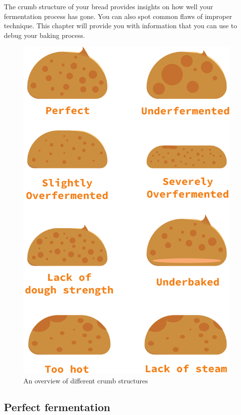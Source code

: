 The crumb structure of your bread provides insights on how well
your fermentation process has gone. You can also spot common flaws
of improper technique. This chapter will provide you with information
that you can use to debug your baking process.

\begin{figure}
  \includegraphics[width=\textwidth]{crumb-structures-book}
  \caption{An overview of different crumb structures}
  \label{fig:crumb-structures-book}
\end{figure}

\subsection{Perfect fermentation}

